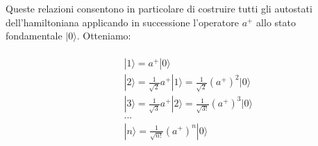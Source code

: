 Queste relazioni consentono in particolare di costruire tutti gli autostati dell'hamiltoniana applicando in successione l'operatore $a^+$ allo stato fondamentale $|0\rangle$. Otteniamo:\\\\
\begin{eqnarray} \label{eq:cap11_10}  %
& &|1\rangle=a^+|0\rangle \nonumber \\
& &|2\rangle=\frac{1}{\sqrt{2}}a^+|1\rangle=\frac{1}{\sqrt{2}}(a^+)^2|0\rangle \nonumber \\
& &|3\rangle= \frac{1}{\sqrt{3}}a^+|2\rangle=\frac{1}{\sqrt{3!}}(a^+)^3|0\rangle   \\
& &... \nonumber\\
& &|n\rangle=\frac{1}{\sqrt{n!}}(a^+)^n|0\rangle \nonumber
\end{eqnarray}



